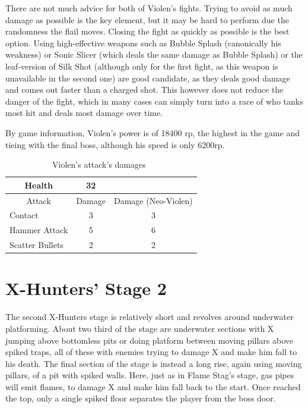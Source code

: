 There are not much advice for both of Violen's fights. Trying to avoid as much damage as possible is the key element, but it may be hard to perform due the randomness the flail moves. Closing the fight as quickly as possible is the best option. Using high-effective weapons such as Bubble Splash (canonically his weakness) or Sonic Slicer (which deals the same damage as Bubble Splash) or the leaf-version of Silk Shot (although only for the first fight, as this weapon is unavailable in the second one) are good candidate, as they deals good damage and comes out faster than a charged shot. This however does not reduce the danger of the fight, which in many cases can simply turn into a race of who tanks most hit and deals most damage over time.

By game information, Violen's power is of 18400 rp, the highest in the game and tieing with the final boss, although his speed is only 6200rp.

\begin{table}[htp]
	\centering
	\begin{tabular}[h]{l c c}
		\toprule
		\multicolumn{1}{c}{Health}  & 32 &\\
		\midrule
		\multicolumn{1}{c}{Attack} & \multicolumn{1}{c}{Damage}& \multicolumn{1}{c}{Damage (Neo-Violen)}\\
		Contact & 3 & 3\\
		Hammer Attack & 5& 6\\
		Scatter Bullets & 2& 2\\
		\bottomrule
	\end{tabular}
	\caption{Violen's attack's damages~\cite{wiki:Violen}}
\end{table}

\section{X-Hunters' Stage 2}

The second X-Hunters stage  is relatively short and revolves around underwater platforming. About two third of the stage are underwater sections with X jumping above bottomless pits or doing platform between moving pillars above spiked traps, all of these with enemies trying to damage X and make him fall to his death. The final section of the stage is instead a long rise, again using moving pillars, of a pit with spiked walls. Here, just as in Flame Stag's stage, gas pipes will emit flames, to damage X and make him fall back to the start. Once reached the top, only a single spiked floor separates the player from the boss door. 

